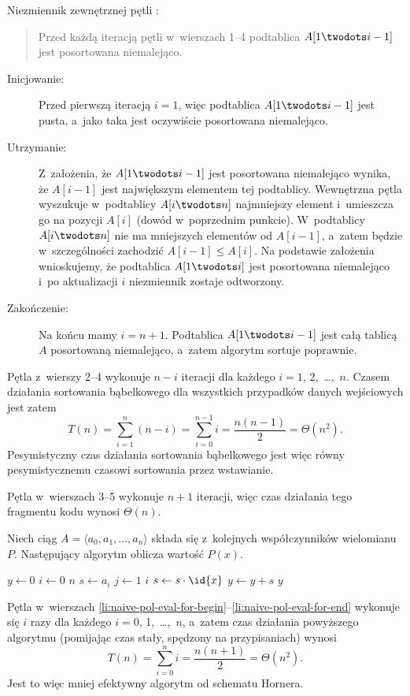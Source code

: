 \subproblem %
Niezmiennik zewnętrznej pętli :
\begin{quote}
Przed każdą iteracją pętli  w~wierszach 1\nobreakdash--4 podtablica $A[1\twodots i-1]$ jest posortowana niemalejąco.
\end{quote}
\begin{description}
	\item[Inicjowanie:] Przed pierwszą iteracją $i=1$, więc podtablica $A[1\twodots i-1]$ jest pusta, a~jako taka jest oczywiście posortowana niemalejąco.
	\item[Utrzymanie:] Z~założenia, że $A[1\twodots i-1]$ jest posortowana niemalejąco wynika, że $A[i-1]$ jest największym elementem tej podtablicy. Wewnętrzna pętla  wyszukuje w~podtablicy $A[i\twodots n]$ najmniejszy element i~umieszcza go na pozycji $A[i]$ (dowód w~poprzednim punkcie). W~podtablicy $A[i\twodots n]$ nie ma mniejszych elementów od $A[i-1]$, a~zatem będzie w~szczególności zachodzić $A[i-1]\le A[i]$. Na podstawie założenia wnioskujemy, że podtablica $A[1\twodots i]$ jest posortowana niemalejąco i~po aktualizacji $i$ niezmiennik zostaje odtworzony.
	\item[Zakończenie:] Na końcu mamy $i=n+1$. Podtablica $A[1\twodots i-1]$ jest całą tablicą $A$ posortowaną niemalejąco, a~zatem algorytm sortuje poprawnie.
\end{description}

\subproblem %
Pętla  z~wierszy 2\nobreakdash--4 wykonuje $n-i$ iteracji dla każdego $i=1$, 2,~\dots,~$n$. Czasem działania sortowania bąbelkowego dla wszystkich przypadków danych wejściowych jest zatem
\[
	T(n) = \sum_{i=1}^n(n-i) = \sum_{i=0}^{n-1}i = \frac{n(n-1)}{2} = \Theta(n^2).
\]
Pesymistyczny czas działania sortowania bąbelkowego jest więc równy pesymistycznemu czasowi sortowania przez wstawianie.


\subproblem %
Pętla  w~wierszach 3\nobreakdash--5 wykonuje $n+1$ iteracji, więc czas działania tego fragmentu kodu wynosi $\Theta(n)$.

\subproblem %
Niech ciąg $A=\langle a_0,a_1,\dots,a_n\rangle$ składa się z~kolejnych współczynników wielomianu $P$. Następujący algorytm oblicza wartość $P(x)$.
\begin{codebox}
\li	$y\gets0$
\li	\For $i\gets0$ \To $n$
\li		\Do
			$s\gets a_i$
\li			\For $j\gets1$ \To $i$ \label{li:naive-pol-eval-for-begin}
\li				\Do $s\gets s\cdot\id{x}$
				\End \label{li:naive-pol-eval-for-end}
\li			$y\gets y+s$
		\End
\li	\Return $y$
\end{codebox}
Pętla  w~wierszach \ref{li:naive-pol-eval-for-begin}\nobreakdash--\ref{li:naive-pol-eval-for-end} wykonuje się $i$ razy dla każdego $i=0$, 1,~\dots,~$n$, a~zatem czas działania powyższego algorytmu (pomijając czas stały, spędzony na przypisaniach) wynosi
\[
	T(n) = \sum_{i=0}^ni = \frac{n(n+1)}{2} = \Theta(n^2).
\]
Jest to więc mniej efektywny algorytm od schematu Hornera.

